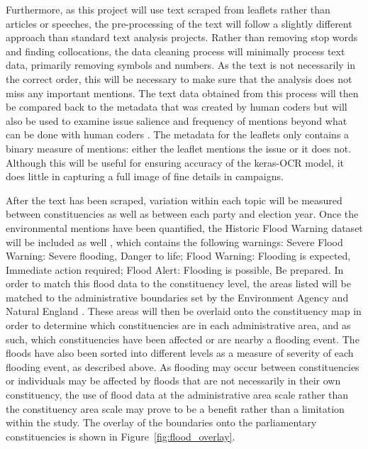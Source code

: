 \documentclass[12pt,letterpaper]{article}
\begin{document}
Furthermore, as this project will use text scraped from leaflets rather than articles or speeches, the pre-processing of the text will follow a slightly different approach than standard text analysis projects. Rather than removing stop words and finding collocations, the data cleaning process will minimally process text data, primarily removing symbols and numbers. As the text is not necessarily in the correct order, this will be necessary to make sure that the analysis does not miss any important mentions. The text data obtained from this process will then be compared back to the metadata that was created by human coders but will also be used to examine issue salience and frequency of mentions beyond what can be done with human coders \autocite{trummParliamentaryCandidatesTheir2023a}. The metadata for the leaflets only contains a binary measure of mentions: either the leaflet mentions the issue or it does not. Although this will be useful for ensuring accuracy of the keras-OCR model, it does little in capturing a full image of fine details in campaigns. 
 


After the text has been scraped, variation within each topic will be measured between constituencies as well as between each party and election year. Once the environmental mentions have been quantified, the Historic Flood Warning dataset will be included as well \autocite{agencyHistoricFloodWarnings2024}, which contains the following warnings: Severe Flood Warning: Severe flooding, Danger to life; Flood Warning: Flooding is expected, Immediate action required; Flood Alert: Flooding is possible, Be prepared. In order to match this flood data to the constituency level, the areas listed will be matched to the administrative boundaries set by the Environment Agency and Natural England \autocite{NaturalEnglandOpen}. These areas will then be overlaid onto the constituency map in order to determine which constituencies are in each administrative area, and as such, which constituencies have been affected or are nearby a flooding event. The floods have also been sorted into different levels as a measure of severity of each flooding event, as described above. As flooding may occur between constituencies or individuals may be affected by floods that are not necessarily in their own constituency, the use of flood data at the administrative area scale rather than the constituency area scale may prove to be a benefit rather than a limitation within the study. The overlay of the boundaries onto the parliamentary constituencies is shown in Figure~\ref{fig:flood_overlay}.
\end{document}
